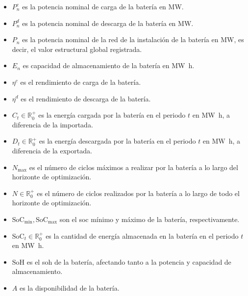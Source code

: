 \begin{itemize}

  \item \( P^{c}_{n} \) es la potencia nominal de carga de la batería en \si{\mega\watt}.

  \item \( P^{d}_{n} \) es la potencia nominal de descarga de la batería en \si{\mega\watt}.

  \item \( P_{n} \) es la potencia nominal de la red de la instalación de la batería en \si{\mega\watt}, es decir, el valor estructural global registrada.

  \item \( E_{n} \) es capacidad de almacenamiento de la batería en \si{{\mega\watt\hour}}.

  \item \( \eta^{c} \) es el rendimiento de carga de la batería.

  \item \( \eta^{d} \) es el rendimiento de descarga de la batería.

  \item \( C_{t} \in \mathbb{R}^{+}_{0} \) es la energía cargada por la batería en el periodo \( t \) en \si{{\mega\watt\hour}}, a diferencia de la importada.

  \item \( D_{t} \in \mathbb{R}^{+}_{0} \) es la energía descargada por la batería en el periodo \( t \) en \si{{\mega\watt\hour}}, a diferencia de la exportada.

  \item \( N_{\text{max}} \) es el número de ciclos máximos a realizar por la batería a lo largo del horizonte de optimización.

  \item \( N \in \mathbb{R}^{+}_{0} \) es el número de ciclos realizados por la batería a lo largo de todo el horizonte de optimización.

  \item \( \text{SoC}_{\text{min}}, \text{SoC}_{\text{max}} \) son el \gls{soc} mínimo y máximo de la batería, respectivamente.

  \item \( \text{SoC}_{t} \in \mathbb{R}^{+}_{0} \) es la cantidad de energía almacenada en la batería en el periodo \( t \) en \si{{\mega\watt\hour}}.

  \item \( \text{SoH} \) es el \gls{soh} de la batería, afectando tanto a la potencia y capacidad de almacenamiento.

  \item \( A \) es la disponibilidad de la batería.

\end{itemize}

